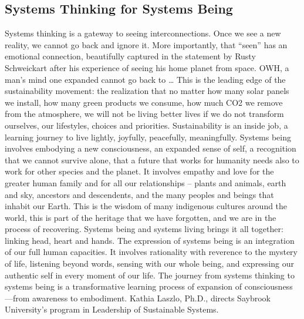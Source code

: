 \subsection{Systems Thinking for Systems Being}

Systems thinking is a gateway to seeing interconnections. Once we see a new reality, we cannot go back and ignore it. More importantly, that “seen” has an emotional connection, beautifully captured in the statement by Rusty Schweickart after his experience of seeing his home planet from space. OWH, a man’s mind one expanded cannot go back to …
This is the leading edge of the sustainability movement: the realization that no matter how many solar panels we install, how many green products we consume, how much CO2 we remove from the atmosphere, we will not be living better lives if we do not transform ourselves, our lifestyles, choices and priorities. Sustainability is an inside job, a learning journey to live lightly, joyfully, peacefully, meaningfully.
Systems being involves embodying a new consciousness, an expanded sense of self, a recognition that we cannot survive alone, that a future that works for humanity needs also to work for other species and the planet. It involves empathy and love for the greater human family and for all our relationships – plants and animals, earth and sky, ancestors and descendents, and the many peoples and beings that inhabit our Earth. This is the wisdom of many indigenous cultures around the world, this is part of the heritage that we have forgotten, and we are in the process of recovering.
Systems being and systems living brings it all together: linking head, heart and hands. The expression of systems being is an integration of our full human capacities. It involves rationality with reverence to the mystery of life, listening beyond words, sensing with our whole being, and expressing our authentic self in every moment of our life. The journey from systems thinking to systems being is a transformative learning process of expansion of consciousness—from awareness to embodiment. Kathia Laszlo, Ph.D., directs Saybrook University's program in Leadership of Sustainable Systems.